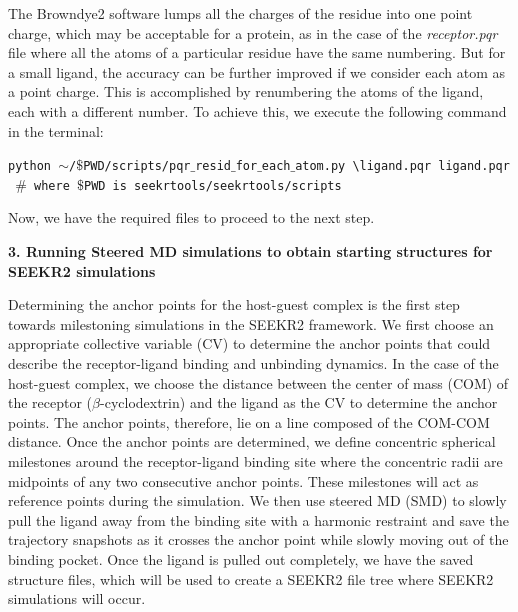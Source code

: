 \documentclass[9pt,training,pubversion]{livecoms}
\begin{document}
\noindent The Browndye2 software lumps all the charges of the residue into one point charge, which may be acceptable for a protein, as in the case of the \textit{receptor.pqr} file where all the atoms of a particular residue have the same numbering. But for a small ligand, the accuracy can be further improved if we consider each atom as a point charge. This is accomplished by renumbering the atoms of the ligand, each with a different number. To achieve this, we execute the following command in the terminal:

\begin{tcolorbox}[colback=black!8!white, colframe=black!50!black, fontlower=\tiny, left=2pt, right=2pt, top=2pt, bottom=2pt] 
\texttt{python $\sim$/$\$$PWD/scripts/pqr$\_$resid$\_$for$\_$each$\_$atom.py \textbackslash \linebreak ligand.pqr ligand.pqr} \\
\texttt{ $\#$ where $\$$PWD is seekrtools/seekrtools/scripts} 
\end{tcolorbox}

\noindent Now, we have the required files to proceed to the next step. 

\vspace{2mm}
\noindent \textbf{3. Running Steered MD simulations to obtain starting structures for SEEKR2 simulations} \par
\vspace{2mm}

\noindent Determining the anchor points for the host-guest complex is the first step towards milestoning simulations in the SEEKR2 framework. We first choose an appropriate collective variable (CV) to determine the anchor points that could describe the receptor-ligand binding and unbinding dynamics. In the case of the host-guest complex, we choose the distance between the center of mass (COM) of the receptor ($\beta$-cyclodextrin) and the ligand as the CV to determine the anchor points. The anchor points, therefore, lie on a line composed of the COM-COM distance. Once the anchor points are determined, we define concentric spherical milestones around the receptor-ligand binding site where the concentric radii are midpoints of any two consecutive anchor points. These milestones will act as reference points during the simulation. We then use steered MD (SMD) to slowly pull the ligand away from the binding site with a harmonic restraint and save the trajectory snapshots as it crosses the anchor point while slowly moving out of the binding pocket. Once the ligand is pulled out completely, we have the saved structure files, which will be used to create a SEEKR2 file tree where SEEKR2 simulations will occur.  \par
\end{document}
